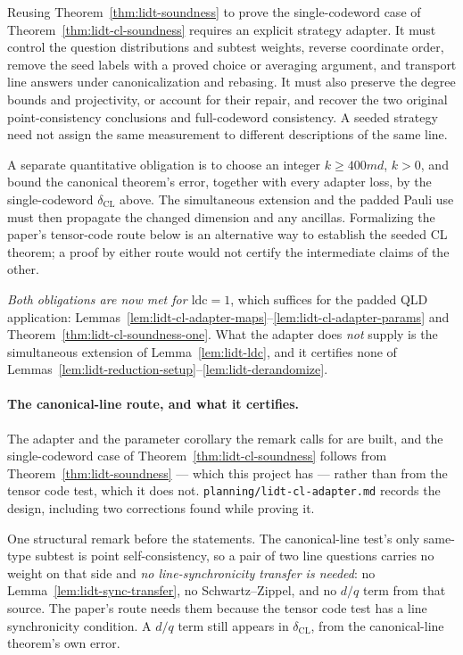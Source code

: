 \begin{remark}
\label{rem:lidt-cl-adapter}
Reusing Theorem~\ref{thm:lidt-soundness} to prove the single-codeword case of
Theorem~\ref{thm:lidt-cl-soundness} requires an explicit strategy adapter. It must
control the question distributions and subtest weights, reverse coordinate order,
remove the seed labels with a proved choice or averaging argument, and transport
line answers under canonicalization and rebasing. It must also preserve the degree
bounds and projectivity, or account for their repair, and recover the two original
point-consistency conclusions and full-codeword consistency. A seeded strategy need
not assign the same measurement to different descriptions of the same line.

A separate quantitative obligation is to choose an integer $k\geq400md$, $k>0$,
and bound the canonical theorem's error, together with every adapter loss, by the
single-codeword $\delta_{\mathrm{CL}}$ above. The simultaneous extension and the
padded Pauli use must then propagate the changed dimension and any ancillas.
Formalizing the paper's tensor-code route below is an alternative way to establish
the seeded CL theorem; a proof by either route would not certify the intermediate
claims of the other.

\emph{Both obligations are now met for $\mathrm{ldc}=1$}, which suffices for the padded QLD application: Lemmas~\ref{lem:lidt-cl-adapter-maps}--\ref{lem:lidt-cl-adapter-params}
and Theorem~\ref{thm:lidt-cl-soundness-one}. What the adapter does \emph{not} supply is the
simultaneous extension of Lemma~\ref{lem:lidt-ldc}, and it certifies none of
Lemmas~\ref{lem:lidt-reduction-setup}--\ref{lem:lidt-derandomize}.
\end{remark}

\paragraph{The canonical-line route, and what it certifies.} The adapter and the parameter
corollary the remark calls for are built, and the single-codeword case of
Theorem~\ref{thm:lidt-cl-soundness} follows from Theorem~\ref{thm:lidt-soundness} --- which
this project has --- rather than from the tensor code test, which it does not.
\texttt{planning/lidt-cl-adapter.md} records the design, including two corrections found while
proving it.

One structural remark before the statements. The canonical-line test's only same-type subtest is
point self-consistency, so a pair of two line questions carries no weight on that side and
\emph{no line-synchronicity transfer is needed}: no Lemma~\ref{lem:lidt-sync-transfer}, no
Schwartz--Zippel, and no $d/q$ term from that source. The paper's route needs them because the
tensor code test has a line synchronicity condition. A $d/q$ term still appears in
$\delta_{\mathrm{CL}}$, from the canonical-line theorem's own error.

